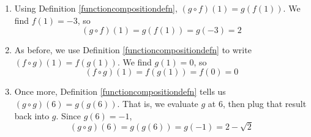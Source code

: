 {\begin{enumerate}

\item  Using Definition \ref{functioncompositiondefn}, $(g \circ f)(1) = g(f(1))$.  We find $f(1) = -3$, so \[(g \circ f)(1) = g(f(1)) = g(-3) = 2 \]

\item As before, we use Definition \ref{functioncompositiondefn} to write $(f \circ g)(1) = f(g(1))$.  We find $g(1) = 0$, so \[(f \circ g)(1) = f(g(1)) = f(0) = 0 \] 

\item  Once more, Definition \ref{functioncompositiondefn} tells us $(g \circ g)(6) = g(g(6))$.  That is, we evaluate $g$ at $6$, then plug that result back into $g$. Since $g(6) = -1$,  \[(g \circ g)(6) = g(g(6)) = g(-1) = 2-\sqrt{2} \]
\end{enumerate}}


\medskip

